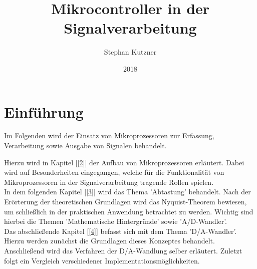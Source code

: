 \documentclass[a4paper,12pt]{article}
\title{Mikrocontroller in der Signalverarbeitung}
\date{2018}
\author{Stephan Kutzner}
\theoremstyle{plain}
\begin{document}

\tableofcontents
\newpage
\section{Einführung}
Im Folgenden wird der Einsatz von Mikroprozessoren zur Erfassung, Verarbeitung sowie Ausgabe von Signalen behandelt.

Hierzu wird in Kapitel [\ref{2}] der Aufbau von Mikroprozessoren erläutert. Dabei wird auf Besonderheiten eingegangen, welche für die Funktionalität von Mikroprozessoren in der Signalverarbeitung tragende Rollen spielen.\\
In dem folgenden Kapitel [\ref{3}] wird das Thema 'Abtastung' behandelt. Nach der Erörterung der theoretischen Grundlagen wird das Nyquist-Theorem bewiesen, um schließlich in der praktischen Anwendung betrachtet zu werden. Wichtig sind hierbei die Themen 'Mathematische Hintergründe' sowie 'A/D-Wandler'.\\
Das abschließende Kapitel [\ref{4}] befasst sich mit dem Thema 'D/A-Wandler'. Hierzu werden zunächst die Grundlagen dieses Konzeptes behandelt. Anschließend wird das Verfahren der D/A-Wandlung selber erläutert. Zuletzt folgt ein Vergleich verschiedener Implementationsmöglichkeiten.\\

\newpage




\newpage

\newpage


\end{document}
